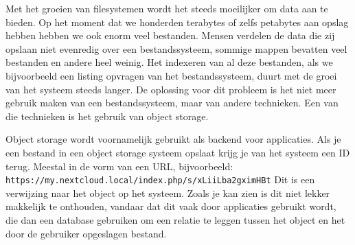 Met het groeien van filesystemen wordt het steeds moeilijker om data aan te bieden. Op het moment dat we honderden terabytes of zelfs petabytes aan opslag hebben hebben we ook enorm veel bestanden. Mensen verdelen de data die zij opslaan niet evenredig over een bestandssysteem, sommige mappen bevatten veel bestanden en andere heel weinig. Het indexeren van al deze bestanden, als we bijvoorbeeld een listing opvragen van het bestandssysteem, duurt met de groei van het systeem steeds langer. De oplossing voor dit probleem is het niet meer gebruik maken van een bestandssysteem, maar van andere technieken. Een van die technieken is het gebruik van object storage.

Object storage wordt voornamelijk gebruikt als backend voor applicaties. Als je een bestand in een object storage systeem opslaat krijg je van het systeem een ID terug. Meestal in de vorm van een URL, bijvoorbeeld:
\texttt{https://my.nextcloud.local/index.php/s/xLiiLba2gximHBt}
Dit is een verwijzing naar het object op het systeem. Zoals je kan zien is dit niet lekker makkelijk te onthouden, vandaar dat dit vaak door applicaties gebruikt wordt, die dan een database gebruiken om een relatie te leggen tussen het object en het door de gebruiker opgeslagen bestand.

